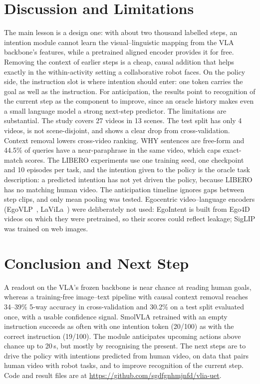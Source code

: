 \documentclass[conference,a4paper]{IEEEtran}
\begin{document}
\section{Discussion and Limitations}

The main lesson is a design one: with about two thousand labelled steps, an intention module cannot learn the visual--linguistic mapping from the VLA backbone's features, while a pretrained aligned encoder provides it for free. Removing the context of earlier steps is a cheap, causal addition that helps exactly in the within-activity setting a collaborative robot faces. On the policy side, the instruction slot is where intention should enter: one token carries the goal as well as the instruction. For anticipation, the results point to recognition of the current step as the component to improve, since an oracle history makes even a small language model a strong next-step predictor. The limitations are substantial. The study covers 27 videos in 13 scenes. The test split has only 4 videos, is not scene-disjoint, and shows a clear drop from cross-validation. Context removal lowers cross-video ranking. WHY sentences are free-form and 44.5\% of queries have a near-paraphrase in the same video, which caps exact-match scores. The LIBERO experiments use one training seed, one checkpoint and 10 episodes per task, and the intention given to the policy is the oracle task description: a predicted intention has not yet driven the policy, because LIBERO has no matching human video. The anticipation timeline ignores gaps between step clips, and only mean pooling was tested. Egocentric video--language encoders (EgoVLP~\cite{lin2022egovlp}, LaViLa~\cite{zhao2023lavila}) were deliberately not used: EgoIntent is built from Ego4D videos on which they were pretrained, so their scores could reflect leakage; SigLIP was trained on web images.

\section{Conclusion and Next Step}

A readout on the VLA's frozen backbone is near chance at reading human goals, whereas a training-free image--text pipeline with causal context removal reaches 34--39\% 5-way accuracy in cross-validation and 30.2\% on a test split evaluated once, with a usable confidence signal. SmolVLA retrained with an empty instruction succeeds as often with one intention token (20/100) as with the correct instruction (19/100). The module anticipates upcoming actions above chance up to 20\,s, but mostly by recognising the present. The next steps are to drive the policy with intentions predicted from human video, on data that pairs human video with robot tasks, and to improve recognition of the current step. Code and result files are at \url{https://github.com/sgdfgnhmjnfd/vlia-uet}.
\end{document}
